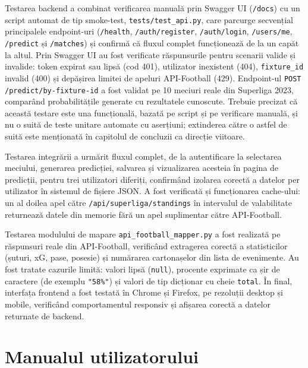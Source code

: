Testarea backend a combinat verificarea manuală prin Swagger UI
(\texttt{/docs}) cu un script automat de tip smoke-test,
\texttt{tests/test\_api.py}, care parcurge secvențial principalele
endpoint-uri (\texttt{/health}, \texttt{/auth/register}, \texttt{/auth/login},
\texttt{/users/me}, \texttt{/predict} și \texttt{/matches}) și confirmă că
fluxul complet funcționează de la un capăt la altul. Prin Swagger UI au fost
verificate răspunsurile pentru scenarii valide și invalide: token expirat sau
lipsă (cod 401), utilizator inexistent (404), \texttt{fixture\_id} invalid
(400) și depășirea limitei de apeluri API-Football (429). Endpoint-ul
\texttt{POST /predict/by-fixture-id} a fost validat pe 10 meciuri reale din
Superliga 2023, comparând probabilitățile generate cu rezultatele cunoscute.
Trebuie precizat că această testare este una funcțională, bazată pe script și
pe verificare manuală, și nu o suită de teste unitare automate cu aserțiuni;
extinderea către o astfel de suită este menționată în capitolul de concluzii
ca direcție viitoare.

Testarea integrării a urmărit fluxul complet, de la autentificare la
selectarea meciului, generarea predicției, salvarea și vizualizarea acesteia
în pagina de predicții, pentru trei utilizatori diferiți, confirmând
izolarea corectă a datelor per utilizator în sistemul de fișiere JSON. A
fost verificată și funcționarea cache-ului: un al doilea apel către
\texttt{/api/superliga/standings} în intervalul de valabilitate returnează
datele din memorie fără un apel suplimentar către API-Football.

Testarea modulului de mapare \texttt{api\_football\_mapper.py} a fost
realizată pe răspunsuri reale din API-Football, verificând extragerea
corectă a statisticilor (șuturi, xG, pase, posesie) și numărarea
cartonașelor din lista de evenimente. Au fost tratate cazurile limită:
valori lipsă (\texttt{null}), procente exprimate ca șir de caractere
(de exemplu \texttt{"58\%"}) și valori de tip dicționar cu cheie
\texttt{total}. În final, interfața frontend a fost testată în Chrome și
Firefox, pe rezoluții desktop și mobile, verificând comportamentul responsiv
și afișarea corectă a datelor returnate de backend.

\section{Manualul utilizatorului}
\label{sec:userguide}

